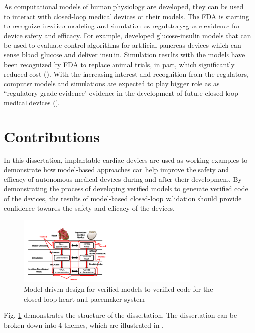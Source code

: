 As computational models of human physiology are developed, they can be used to interact with closed-loop medical devices or their models. 
The FDA is starting to recognize in-silico modeling and simulation as regulatory-grade evidence for device safety and efficacy. 
For example, \cite{pancreas_paul} developed glucose-insulin models that can be used to evaluate control algorithms for artificial pancreas devices which can sense blood glucose and deliver insulin. 
Simulation results with the models have been recognized by FDA to replace animal trials, in part, which significantly reduced cost (\cite{pancreas}). 
With the increasing interest and recognition from the regulators, computer models and simulations are expected to play bigger role as as ``regulatory-grade evidence" evidence in the development of future closed-loop medical devices ().

\section{Contributions}
In this dissertation, implantable cardiac devices are used as working examples to demonstrate how model-based approaches can help improve the safety and efficacy of autonomous medical devices during and after their development. 
By demonstrating the process of developing verified models to generate verified code of the devices, the results of model-based closed-loop validation should provide confidence towards the safety and efficacy of the devices.
\begin{figure}[t]
		\centering
		\includegraphics[width=0.8\textwidth]{figs/model_based_b.pdf}
		\caption{\small Model-driven design for verified models to verified code for the closed-loop heart and pacemaker system}
		\label{fig:modeling_overview}
\end{figure}

Fig. \ref{fig:modeling_overview} demonstrates the structure of the dissertation.
The dissertation can be broken down into 4 themes, which are illustrated in . 

